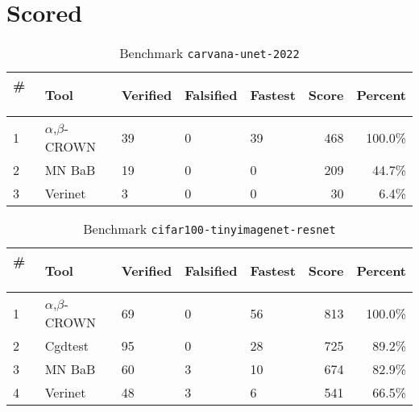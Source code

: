 
\section{Scored}

\begin{table}[h]
\begin{center}
\caption{Benchmark \texttt{carvana-unet-2022}} \label{tab:cat_{cat}}
{\setlength{\tabcolsep}{2pt}
\begin{tabular}[h]{@{}lllllrr@{}}
\toprule
\textbf{\# ~} & \textbf{Tool} & \textbf{Verified} & \textbf{Falsified} & \textbf{Fastest} & \textbf{Score} & \textbf{Percent}\\
\midrule
1 & $\alpha$,$\beta$-CROWN & 39 & 0 & 39 & 468 & 100.0\% \\
2 & MN BaB & 19 & 0 & 0 & 209 & 44.7\% \\
3 & Verinet & 3 & 0 & 0 & 30 & 6.4\% \\
\bottomrule
\end{tabular}
}
\end{center}
\end{table}




\begin{table}[h]
\begin{center}
\caption{Benchmark \texttt{cifar100-tinyimagenet-resnet}} \label{tab:cat_{cat}}
{\setlength{\tabcolsep}{2pt}
\begin{tabular}[h]{@{}lllllrr@{}}
\toprule
\textbf{\# ~} & \textbf{Tool} & \textbf{Verified} & \textbf{Falsified} & \textbf{Fastest} & \textbf{Score} & \textbf{Percent}\\
\midrule
1 & $\alpha$,$\beta$-CROWN & 69 & 0 & 56 & 813 & 100.0\% \\
2 & Cgdtest & 95 & 0 & 28 & 725 & 89.2\% \\
3 & MN BaB & 60 & 3 & 10 & 674 & 82.9\% \\
4 & Verinet & 48 & 3 & 6 & 541 & 66.5\% \\
\bottomrule
\end{tabular}
}
\end{center}
\end{table}




